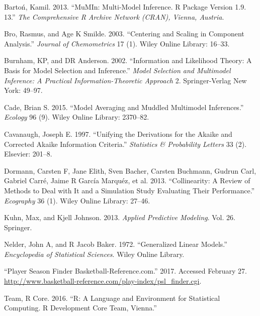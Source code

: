 \documentclass[]{elsarticle} %
\begin{document}
\hypertarget{refs}{}
\hypertarget{ref-barton2013mumin}{}
Bartoń, Kamil. 2013. ``MuMIn: Multi-Model Inference. R Package Version
1.9. 13.'' \emph{The Comprehensive R Archive Network (CRAN), Vienna,
Austria}.

\hypertarget{ref-bro2003centering}{}
Bro, Rasmus, and Age K Smilde. 2003. ``Centering and Scaling in
Component Analysis.'' \emph{Journal of Chemometrics} 17 (1). Wiley
Online Library: 16--33.

\hypertarget{ref-burnham2002information}{}
Burnham, KP, and DR Anderson. 2002. ``Information and Likelihood Theory:
A Basis for Model Selection and Inference.'' \emph{Model Selection and
Multimodel Inference: A Practical Information-Theoretic Approach} 2.
Springer-Verlag New York: 49--97.

\hypertarget{ref-cade2015model}{}
Cade, Brian S. 2015. ``Model Averaging and Muddled Multimodel
Inferences.'' \emph{Ecology} 96 (9). Wiley Online Library: 2370--82.

\hypertarget{ref-cavanaugh1997unifying}{}
Cavanaugh, Joseph E. 1997. ``Unifying the Derivations for the Akaike and
Corrected Akaike Information Criteria.'' \emph{Statistics \& Probability
Letters} 33 (2). Elsevier: 201--8.

\hypertarget{ref-dormann2013collinearity}{}
Dormann, Carsten F, Jane Elith, Sven Bacher, Carsten Buchmann, Gudrun
Carl, Gabriel Carré, Jaime R García Marquéz, et al. 2013.
``Collinearity: A Review of Methods to Deal with It and a Simulation
Study Evaluating Their Performance.'' \emph{Ecography} 36 (1). Wiley
Online Library: 27--46.

\hypertarget{ref-kuhn2013applied}{}
Kuhn, Max, and Kjell Johnson. 2013. \emph{Applied Predictive Modeling}.
Vol. 26. Springer.

\hypertarget{ref-nelder1972generalized}{}
Nelder, John A, and R Jacob Baker. 1972. ``Generalized Linear Models.''
\emph{Encyclopedia of Statistical Sciences}. Wiley Online Library.

\hypertarget{ref-BR_2}{}
``Player Season Finder Basketball-Reference.com.'' 2017. Accessed
February 27.
\url{http://www.basketball-reference.com/play-index/psl_finder.cgi}.

\hypertarget{ref-team2016r}{}
Team, R Core. 2016. ``R: A Language and Environment for Statistical
Computing. R Development Core Team, Vienna.''
\end{document}
